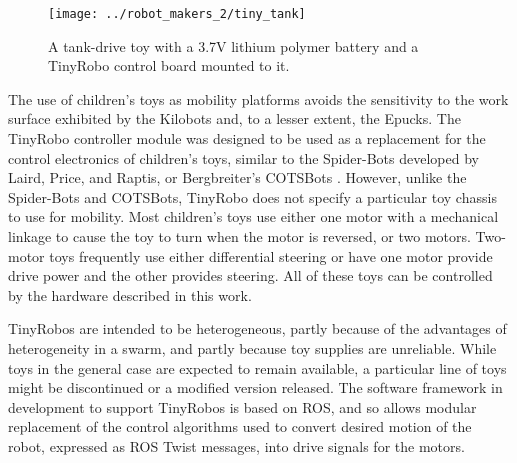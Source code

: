 \documentclass[]{article}
\begin{document}
\begin{figure}
\centering
\texttt{[image: ../robot\_makers\_2/tiny\_tank]}
\caption{A tank-drive toy with a 3.7V lithium polymer battery and a TinyRobo control board mounted to it.}
\end{figure}

The use of children's toys as mobility platforms avoids the sensitivity to the work surface exhibited by the Kilobots and, to a lesser extent, the Epucks.
The TinyRobo controller module was designed to be used as a replacement for the control electronics of children's toys, similar to the Spider-Bots developed by Laird, Price, and Raptis, or Bergbreiter's COTSBots \cite{lairdspider, bergbreiter2003cotsbots}.
However, unlike the Spider-Bots and COTSBots, TinyRobo does not specify a particular toy chassis to use for mobility. 
Most children's toys use either one motor with a mechanical linkage to cause the toy to turn when the motor is reversed, or two motors.
Two-motor toys frequently use either differential steering or have one motor provide drive power and the other provides steering. 
All of these toys can be controlled by the hardware described in this work. 

TinyRobos are intended to be heterogeneous, partly because of the advantages of heterogeneity in a swarm, and partly because toy supplies are unreliable.
While toys in the general case are expected to remain available, a particular line of toys might be discontinued or a modified version released. 
The software framework in development to support TinyRobos is based on ROS, and so allows modular replacement of the control algorithms used to convert desired motion of the robot, expressed as ROS Twist messages, into drive signals for the motors. 

\end{document}
